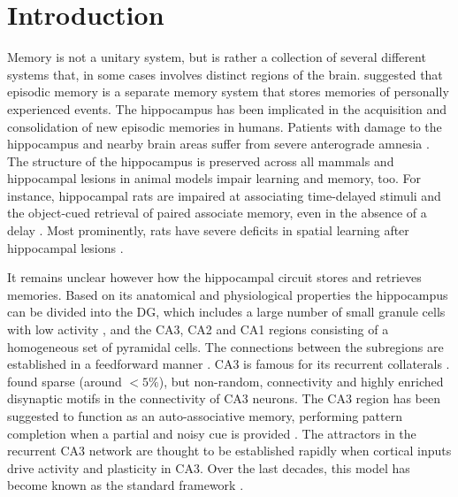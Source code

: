 \documentclass[utf8]{frontiersSCNS} %
\begin{document}
\section{Introduction}
Memory is not a unitary system, but is rather a collection of several different systems that, in some cases involves distinct regions of the brain. \citet{tulving1972episodic} suggested that episodic memory is a separate memory system that stores memories of personally experienced events. The hippocampus has been implicated in the acquisition and consolidation of new episodic memories in humans. Patients with damage to the hippocampus and nearby brain areas suffer from severe anterograde amnesia \citep{scoville1957loss, milner1968further}. The structure of the hippocampus is preserved across all mammals \citep{allen2013evolution} and hippocampal lesions in animal models impair learning and memory, too. For instance, hippocampal rats are impaired at associating time-delayed stimuli \citep{gluck2001gateway} and the object-cued retrieval of paired associate memory, even in the absence of a delay \citep{yoon2012hippocampus}. Most prominently, rats have severe deficits in spatial learning after hippocampal lesions \citep{morris1982place}.

It remains unclear however how the hippocampal circuit stores and retrieves memories. Based on its anatomical and physiological properties the hippocampus can be divided into the DG, which includes a large number of small granule cells with low activity \citep{leutgeb2007pattern}, and the CA3, CA2 and CA1 regions consisting of a homogeneous set of pyramidal cells. The connections between the subregions are established in a feedforward manner \citep{amaral1990chapter}. CA3 is famous for its recurrent collaterals \citep{ishizuka1990organization, li1994hippocampal}. \citet{guzman2016synaptic} found sparse (around $<5\%$), but non-random, connectivity and highly enriched disynaptic motifs in the connectivity of CA3 neurons. 
%
The CA3 region has been suggested to function as an auto-associative memory, performing pattern completion when a partial and noisy cue is provided \citep{marr1991simple, mcnaughton1987hippocampal, treves1994computational, o1994hippocampal, rolls2007attractor, guzman2016synaptic}. The attractors in the recurrent CA3 network are thought to be established rapidly when cortical inputs drive activity and plasticity in CA3. Over the last decades, this model has become known as the standard framework \citep{nadel1997memory}. %
\end{document}
